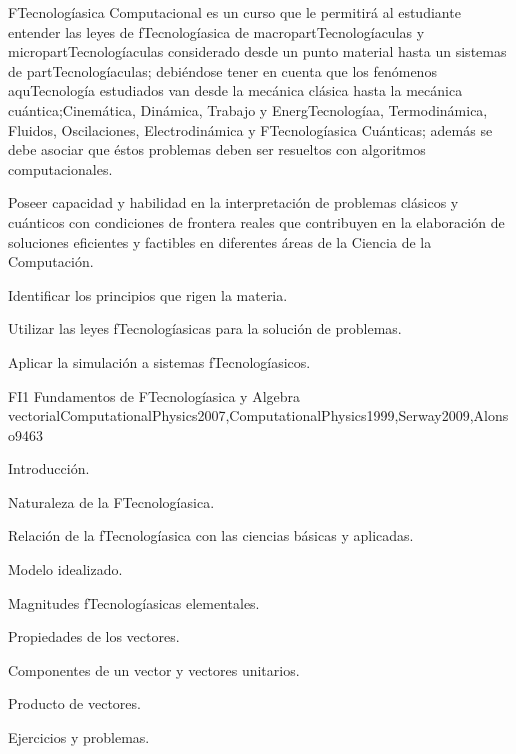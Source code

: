 \begin{syllabus}


\begin{justification}
FTecnologíasica Computacional es un curso que le permitirá al estudiante entender
las leyes de fTecnologíasica de macropartTecnologíaculas y micropartTecnologíaculas considerado desde un
punto material hasta un sistemas de partTecnologíaculas; debiéndose tener en cuenta que los
fenómenos aquTecnología estudiados van desde la mecánica clásica hasta la mecánica cuántica;Cinemática, Dinámica, Trabajo y EnergTecnologíaa, Termodinámica, Fluidos, Oscilaciones, Electrodinámica y FTecnologíasica Cuánticas; 
además se debe asociar que éstos problemas deben ser resueltos con algoritmos computacionales.

Poseer capacidad y habilidad en la interpretación de problemas clásicos y cuánticos 
con condiciones de frontera reales que contribuyen en la elaboración de soluciones eficientes
y factibles en diferentes áreas de la Ciencia de la Computación.
\end{justification}

\begin{goals}
\item Identificar los principios que rigen la materia.
\item Utilizar las leyes fTecnologíasicas para la solución de problemas.
\item Aplicar la simulación a sistemas fTecnologíasicos.
\end{goals}

\begin{outcomes}
\end{outcomes}

\begin{unit}{FI1 Fundamentos de FTecnologíasica y Algebra vectorial}{ComputationalPhysics2007,ComputationalPhysics1999,Serway2009,Alonso94}{6}{3}
\begin{topics}
      \item Introducción.
      \item Naturaleza de la FTecnologíasica.
      \item Relación de la fTecnologíasica con las ciencias básicas y aplicadas.
      \item Modelo idealizado.
      \item Magnitudes fTecnologíasicas  elementales.
      \item Propiedades de los vectores.
      \item Componentes de un vector y vectores unitarios.
      \item Producto de vectores.
      \item Ejercicios y problemas.
   \end{topics}


\end{unit}
\end{syllabus}
